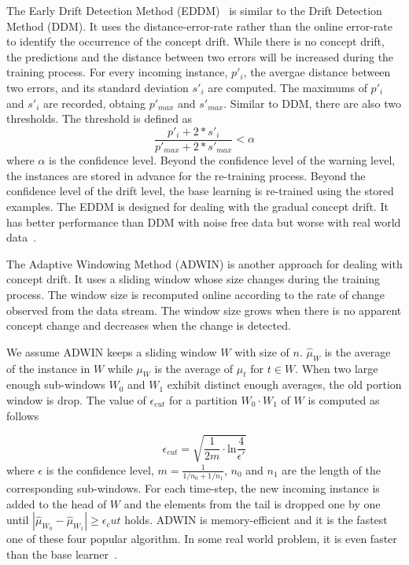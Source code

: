 The Early Drift Detection Method (EDDM)~\cite{baena2006ear} is similar to the Drift Detection Method (DDM). It uses the distance-error-rate rather than the online error-rate to identify the occurrence of the concept drift. While there is no concept drift, the predictions and the distance between two errors will be increased during the training process. For every incoming instance, $p'_i$, the avergae distance between two errors, and its standard deviation $s'_i$ are computed. The maximums of $p'_i$ and $s'_i$ are recorded, obtaing $p'_{max}$ and $s'_{max}$. Similar to DDM, there are also two thresholds. The threshold is defined as 
\begin{equation}
\frac{p'_i + 2 * s'_i} {p'_{max} + 2*s'_{max}}<\alpha
\end{equation}
where $\alpha$ is the confidence level. Beyond the confidence level of the warning level, the instances are stored in advance for the re-training process. Beyond the confidence level of the drift level, the base learning is re-trained using the stored examples. The EDDM is designed for dealing with the gradual concept drift. It has better performance than DDM with noise free data but worse with real world data~\cite{Goncalves2014}.


The Adaptive Windowing Method (ADWIN) is another approach for dealing with concept drift. It uses a sliding window whose size changes during the training process. The window size is recomputed online according to the rate of change observed from the data stream. The window size grows when there is no apparent concept change and decreases when the change is detected.

We assume ADWIN keeps a sliding window $W$ with size of $n$. $\hat{\mu}_W$ is the average of the instance in $W$ while $\mu_W$ is the average of $\mu_t$ for $t \in W$. When two large enough sub-windows $W_0$ and $W_1$ exhibit distinct enough averages, the old portion window is drop. The value of $\epsilon_{cut}$ for a partition $W_0 \cdot W_1$ of $W$ is computed as follows

\begin{equation}
\epsilon_{cut} = \sqrt{\frac{1}{2m} \cdot \mbox{ln} \frac{4}{\epsilon'}}
\end{equation} 
where $\epsilon$ is the confidence level, $m = \frac{1}{1/n_0 + 1/n_1}$, $n_0$ and $n_1$ are the length of the corresponding sub-windows. For each time-step, the new incoming instance is added to the head of $W$ and the elements from the tail is dropped one by one until $|\hat{\mu}_{W_0} - \hat{\mu}_{W_1}| \geq \epsilon_cut$ holds. ADWIN is memory-efficient and it is the fastest one of these four popular algorithm. In some real world problem, it is even faster than the base learner~\cite{Goncalves2014}. 

